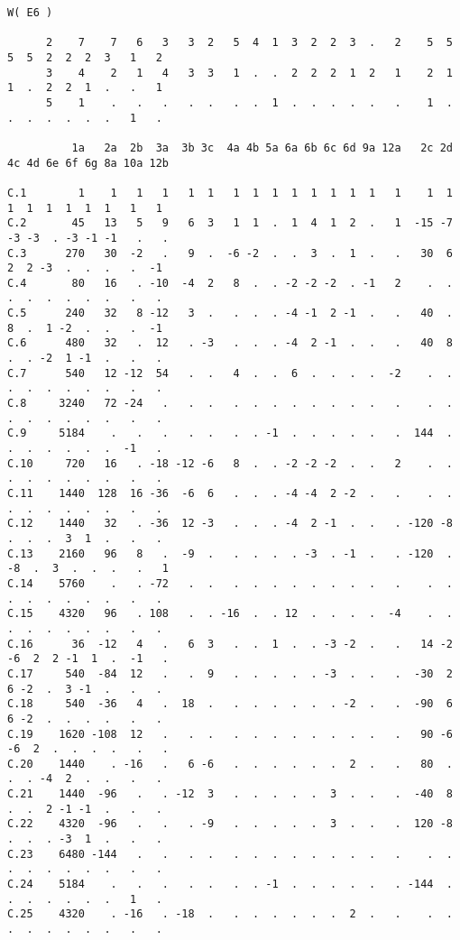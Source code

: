 
\usepackage{fullpage}


\tiny
\begin{verbatim}
W( E6 )

      2    7    7   6   3   3  2   5  4  1  3  2  2  3  .   2    5  5  5  5  2  2  2  3   1   2
      3    4    2   1   4   3  3   1  .  .  2  2  2  1  2   1    2  1  1  .  2  2  1  .   .   1
      5    1    .   .   .   .  .   .  .  1  .  .  .  .  .   .    1  .  .  .  .  .  .  .   1   .

          1a   2a  2b  3a  3b 3c  4a 4b 5a 6a 6b 6c 6d 9a 12a   2c 2d 4c 4d 6e 6f 6g 8a 10a 12b

C.1        1    1   1   1   1  1   1  1  1  1  1  1  1  1   1    1  1  1  1  1  1  1  1   1   1
C.2       45   13   5   9   6  3   1  1  .  1  4  1  2  .   1  -15 -7 -3 -3  . -3 -1 -1   .   .
C.3      270   30  -2   .   9  .  -6 -2  .  .  3  .  1  .   .   30  6  2  2 -3  .  .  .   .  -1
C.4       80   16   . -10  -4  2   8  .  . -2 -2 -2  . -1   2    .  .  .  .  .  .  .  .   .   .
C.5      240   32   8 -12   3  .   .  .  . -4 -1  2 -1  .   .   40  .  8  .  1 -2  .  .   .  -1
C.6      480   32   .  12   . -3   .  .  . -4  2 -1  .  .   .   40  8  .  . -2  1 -1  .   .   .
C.7      540   12 -12  54   .  .   4  .  .  6  .  .  .  .  -2    .  .  .  .  .  .  .  .   .   .
C.8     3240   72 -24   .   .  .   .  .  .  .  .  .  .  .   .    .  .  .  .  .  .  .  .   .   .
C.9     5184    .   .   .   .  .   .  . -1  .  .  .  .  .   .  144  .  .  .  .  .  .  .  -1   .
C.10     720   16   . -18 -12 -6   8  .  . -2 -2 -2  .  .   2    .  .  .  .  .  .  .  .   .   .
C.11    1440  128  16 -36  -6  6   .  .  . -4 -4  2 -2  .   .    .  .  .  .  .  .  .  .   .   .
C.12    1440   32   . -36  12 -3   .  .  . -4  2 -1  .  .   . -120 -8  .  .  .  3  1  .   .   .
C.13    2160   96   8   .  -9  .   .  .  .  . -3  . -1  .   . -120  . -8  .  3  .  .  .   .   1
C.14    5760    .   . -72   .  .   .  .  .  .  .  .  .  .   .    .  .  .  .  .  .  .  .   .   .
C.15    4320   96   . 108   .  . -16  .  . 12  .  .  .  .  -4    .  .  .  .  .  .  .  .   .   .
C.16      36  -12   4   .   6  3   .  .  1  .  . -3 -2  .   .   14 -2 -6  2  2 -1  1  .  -1   .
C.17     540  -84  12   .   .  9   .  .  .  .  . -3  .  .   .  -30  2  6 -2  .  3 -1  .   .   .
C.18     540  -36   4   .  18  .   .  .  .  .  .  . -2  .   .  -90  6  6 -2  .  .  .  .   .   .
C.19    1620 -108  12   .   .  .   .  .  .  .  .  .  .  .   .   90 -6 -6  2  .  .  .  .   .   .
C.20    1440    . -16   .   6 -6   .  .  .  .  .  .  2  .   .   80  .  .  . -4  2  .  .   .   .
C.21    1440  -96   .   . -12  3   .  .  .  .  .  3  .  .   .  -40  8  .  .  2 -1 -1  .   .   .
C.22    4320  -96   .   .   . -9   .  .  .  .  .  3  .  .   .  120 -8  .  .  . -3  1  .   .   .
C.23    6480 -144   .   .   .  .   .  .  .  .  .  .  .  .   .    .  .  .  .  .  .  .  .   .   .
C.24    5184    .   .   .   .  .   .  . -1  .  .  .  .  .   . -144  .  .  .  .  .  .  .   1   .
C.25    4320    . -16   . -18  .   .  .  .  .  .  .  2  .   .    .  .  .  .  .  .  .  .   .   .

\end{verbatim}

